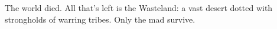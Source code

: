 
The world died. All that's left is the Wasteland: a vast desert dotted with strongholds of warring tribes. Only the mad survive.
